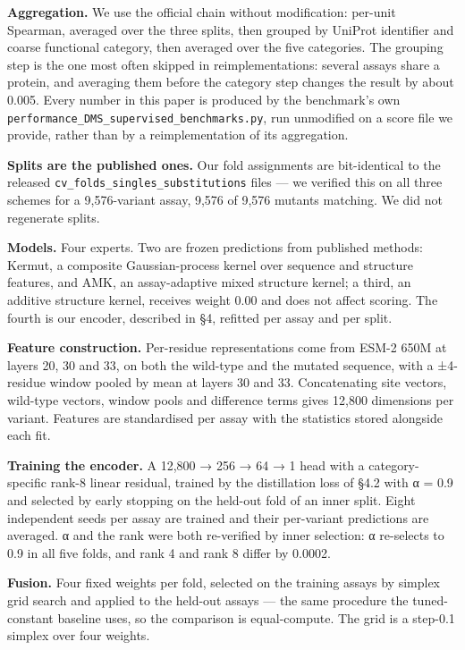 \documentclass[sigconf,review,nonacm]{acmart}
\begin{document}
\textbf{Aggregation.} We use the official chain without modification: per-unit Spearman, averaged over the
three splits, then grouped by UniProt identifier and coarse functional category, then averaged over the
five categories. The grouping step is the one most often skipped in reimplementations: several assays
share a protein, and averaging them before the category step changes the result by about 0.005. Every
number in this paper is produced by the benchmark's own
\texttt{performance\_DMS\_supervised\_benchmarks.py}, run unmodified on a score file we provide, rather than by a
reimplementation of its aggregation.

\textbf{Splits are the published ones.} Our fold assignments are bit-identical to the released
\texttt{cv\_folds\_singles\_substitutions} files --- we verified this on all three schemes for a 9,576-variant
assay, 9,576 of 9,576 mutants matching. We did not regenerate splits.

\textbf{Models.} Four experts. Two are frozen predictions from published methods: Kermut, a composite
Gaussian-process kernel over sequence and structure features, and AMK, an assay-adaptive mixed structure
kernel; a third, an additive structure kernel, receives weight 0.00 and does not affect scoring. The
fourth is our encoder, described in §4, refitted per assay and per split.

\textbf{Feature construction.} Per-residue representations come from ESM-2 650M at layers 20, 30 and 33, on
both the wild-type and the mutated sequence, with a ±4-residue window pooled by mean at layers 30 and
33. Concatenating site vectors, wild-type vectors, window pools and difference terms gives 12,800
dimensions per variant. Features are standardised per assay with the statistics stored alongside each
fit.

\textbf{Training the encoder.} A 12,800 → 256 → 64 → 1 head with a category-specific rank-8 linear residual,
trained by the distillation loss of §4.2 with α = 0.9 and selected by early stopping on the held-out
fold of an inner split. Eight independent seeds per assay are trained and their per-variant predictions
are averaged. α and the rank were both re-verified by inner selection: α re-selects to 0.9 in all five
folds, and rank 4 and rank 8 differ by 0.0002.

\textbf{Fusion.} Four fixed weights per fold, selected on the training assays by simplex grid search and
applied to the held-out assays --- the same procedure the tuned-constant baseline uses, so the comparison
is equal-compute. The grid is a step-0.1 simplex over four weights.
\end{document}
